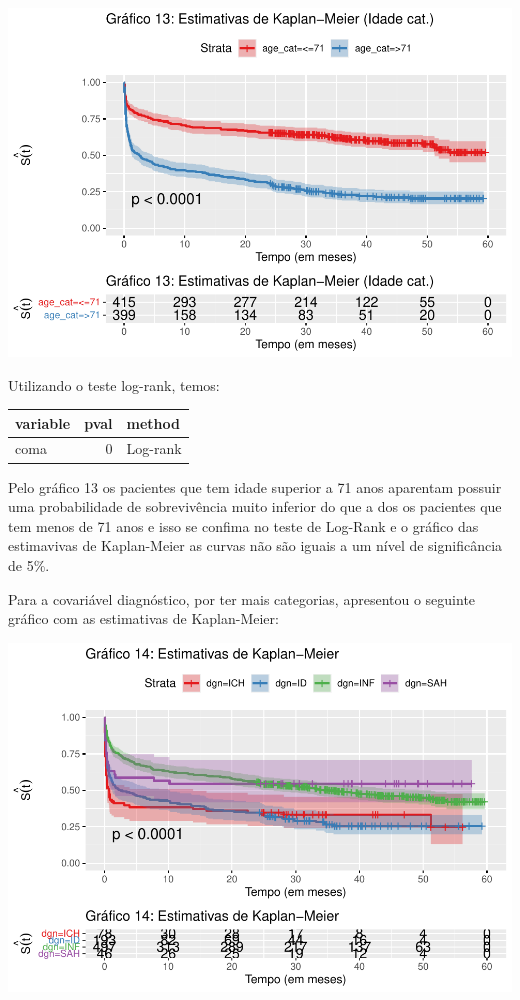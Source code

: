 \documentclass[]{article}
\begin{document}
\begin{center}\includegraphics[width=0.8\linewidth]{Atividade_3_files/figure-latex/unnamed-chunk-13-1} \end{center}

Utilizando o teste log-rank, temos:

\begin{longtable}[]{@{}lrl@{}}
\toprule
variable & pval & method\tabularnewline
\midrule
\endhead
coma & 0 & Log-rank\tabularnewline
\bottomrule
\end{longtable}

Pelo gráfico 13 os pacientes que tem idade superior a 71 anos aparentam
possuir uma probabilidade de sobrevivência muito inferior do que a dos
os pacientes que tem menos de 71 anos e isso se confima no teste de
Log-Rank e o gráfico das estimavivas de Kaplan-Meier as curvas não são
iguais a um nível de significância de 5\%.

Para a covariável diagnóstico, por ter mais categorias, apresentou o
seguinte gráfico com as estimativas de Kaplan-Meier:

\begin{center}\includegraphics[width=0.8\linewidth]{Atividade_3_files/figure-latex/unnamed-chunk-15-1} \end{center}
\end{document}

